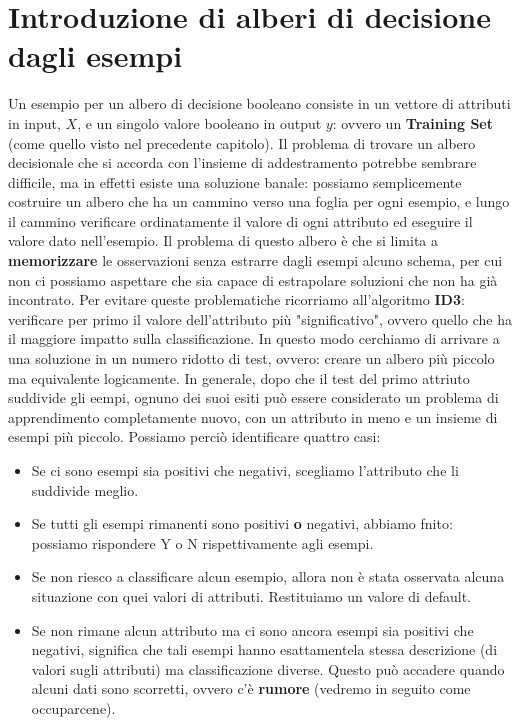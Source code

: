 \section{Introduzione di alberi di decisione dagli esempi}
Un esempio per un albero di decisione booleano consiste in un vettore di attributi in input, $X$, e un singolo valore booleano in output $y$: ovvero un \textbf{Training Set} (come quello visto nel precedente capitolo).
Il problema di trovare un albero decisionale che si accorda con l'insieme di addestramento potrebbe sembrare difficile, ma in effetti esiste una soluzione banale: possiamo semplicemente costruire un albero che ha un cammino verso una foglia per ogni esempio, e lungo il cammino verificare ordinatamente il valore di ogni attributo ed eseguire il valore dato nell'esempio. Il problema di questo albero è che si limita a \textbf{memorizzare} le osservazioni senza estrarre dagli esempi alcuno schema, per cui non ci possiamo aspettare che sia capace di estrapolare soluzioni che non ha già incontrato. Per evitare queste problematiche ricorriamo all'algoritmo \textbf{ID3}: verificare per primo il valore dell'attributo più "significativo", ovvero quello che ha il maggiore impatto sulla classificazione. In questo modo cerchiamo di arrivare a una soluzione in un numero ridotto di test, ovvero: creare un albero più piccolo ma equivalente logicamente. In generale, dopo che il test del primo attriuto suddivide gli eempi, ognuno dei suoi esiti può essere considerato un problema di apprendimento completamente nuovo, con un attributo in meno e un insieme di esempi più piccolo. Possiamo perciò identificare quattro casi:
\begin{itemize}
    \item Se ci sono esempi sia positivi che negativi, scegliamo l'attributo che li suddivide meglio.
    \item Se tutti gli esempi rimanenti sono positivi \textbf{o} negativi, abbiamo fnito: possiamo rispondere Y o N rispettivamente agli esempi.
    \item Se non riesco a classificare alcun esempio, allora non è stata osservata alcuna situazione con quei valori di attributi. Restituiamo un valore di default.
    \item Se non rimane alcun attributo ma ci sono ancora esempi sia positivi che negativi, significa che tali esempi hanno esattamentela stessa descrizione (di valori sugli attributi) ma classificazione diverse. Questo può accadere quando alcuni dati sono scorretti, ovvero c'è \textbf{rumore} (vedremo in seguito come occuparcene).
\end{itemize}
